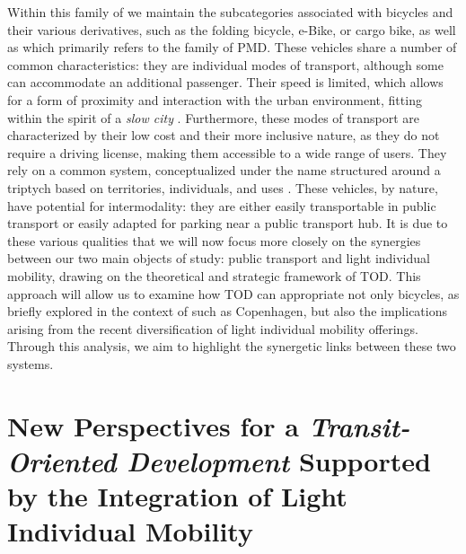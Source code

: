 \begin{refsegment}
Within this family of  we maintain the subcategories associated with bicycles and their various derivatives, such as the folding bicycle, \acrshort{e-Bike}, or cargo bike, as well as  which primarily refers to the family of \acrshort{PMD}. These vehicles share a number of common characteristics: they are individual modes of transport, although some  can accommodate an additional passenger. Their speed is limited, which allows for a form of proximity and interaction with the urban environment, fitting within the spirit of a \textsl{slow city} \textcolor{blue}{\autocite[103-108]{bu_tout-voiture_2024}}. Furthermore, these modes of transport are characterized by their low cost and their more inclusive nature, as they do not require a driving license, making them accessible to a wide range of users. They rely on a common system, conceptualized under the name  structured around a triptych based on territories, individuals, and uses \textcolor{blue}{\autocites[20-21]{rerat_au_2019}[492]{watson_how_2012}}. These vehicles, by nature, have potential for intermodality: they are either easily transportable in public transport or easily adapted for parking near a public transport hub. It is due to these various qualities that we will now focus more closely on the synergies between our two main objects of study: public transport and light individual mobility, drawing on the theoretical and strategic framework of \acrshort{TOD}. This approach will allow us to examine how \acrshort{TOD} can appropriate not only bicycles, as briefly explored in the context of  such as Copenhagen, but also the implications arising from the recent diversification of light individual mobility offerings. Through this analysis, we aim to highlight the synergetic links between these two systems.%

\newpage
{} %
\section{New Perspectives for a \textsl{Transit-Oriented Development} Supported by the Integration of Light Individual Mobility
    \label{chap1:btod}
    }


\end{refsegment}
